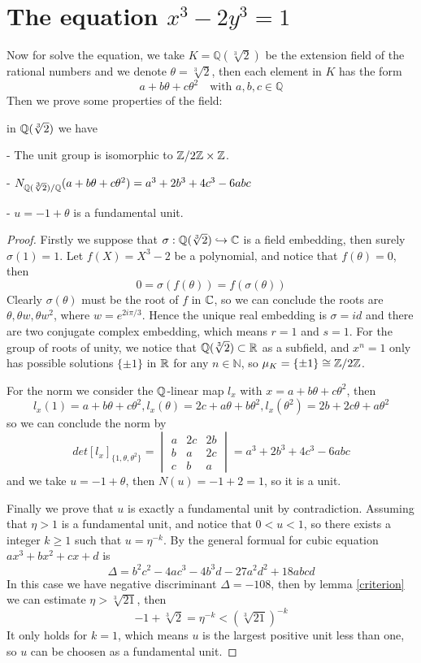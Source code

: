 \section{The equation $x^3-2y^3=1$}
Now for solve the equation, we take \(K = \mathbb{Q}(\sqrt[3]{2})\) be the extension field of the rational numbers and we denote \(\theta = \sqrt[3]{2}\), then each element in \(K\) has the form
\[a+b\theta +c \theta^2 \quad  \text{with } a,b,c  \in \mathbb{Q}\]
Then we prove some properties of the field:
\begin{proposition} \label{qqsqrt}
    in \(\mathbb{Q}(\sqrt[3]{2})\) we have

    - The unit group is isomorphic to \(\mathbb{Z}/2\mathbb{Z} \times \mathbb{Z}\).

    - \(N_{\mathbb{Q}(\sqrt[3]{2}) / \mathbb{Q}}(a+b\theta+c\theta^2) = a^3+2b^3+4c^3-6abc\)

    - \(u = -1 + \theta \) is a fundamental unit.


    \begin{proof}
        Firstly we suppose that \(\sigma: \mathbb{Q}(\sqrt[3]{2}) \hookrightarrow  \mathbb{C} \) is a field embedding, then surely \(\sigma(1)=1\). Let \(f(X) = X^3-2\) be a polynomial, and notice that \(f(\theta) = 0\), then
        \[0 = \sigma(f(\theta)) = f(\sigma(\theta))\]
        Clearly \(\sigma(\theta)\) must be the root of \(f\) in \(\mathbb{C}\), so we can conclude the roots are \(\theta, \theta w , \theta w^2\), where \(w = e^{2i\pi /3}\). Hence the unique real embedding is \(\sigma=id\) and there are two conjugate complex embedding, which means \(r=1\) and \(s=1\). For the group of roots of unity, we notice that \(\mathbb{Q}(\sqrt[3]{2}) \subset \mathbb{R}\) as a subfield, and \(x^n=1\) only has possible solutions \(\{\pm 1\}\) in \(\mathbb{R}\) for any \(n \in \mathbb{N}\), so \(\mu_K = \{\pm 1\} \cong \mathbb{Z}/2\mathbb{Z}\).

        For the norm we consider the \(\mathbb{Q}\)-linear map \(l_x\) with \(x=a+b \theta + c \theta^2\), then
        \[l_x(1) = a+b \theta + c \theta^2, l_x(\theta )= 2c+a \theta + b \theta ^2, l_x(\theta ^2) = 2b+ 2c \theta + a \theta ^2 \]
        so we can conclude the norm by 
        \[det{[l_x]_{\{1,\theta,\theta ^2\}}} = \begin{vmatrix}
            a & 2c & 2b \\
            b & a & 2c \\
            c & b & a
        \end{vmatrix} = a^3+2b^3+4c^3-6abc\]
        and we take \(u= -1 + \theta\), then \(N(u) = -1+2=1\), so it is a unit.

        Finally we prove that \(u\) is exactly a fundamental unit by contradiction. Assuming that \(\eta>1\) is a fundamental unit, and notice that \(0<u<1\), so there exists a integer \(k \geq 1\) such that \(u = \eta^{-k}\). By the general formual for cubic equation \(ax^3+bx^2+cx+d\) is 
        \[\Delta = b^2 c^2 -4ac^3-4b^3d-27a^2d^2+18abcd\]
        In this case we have negative discriminant \(\Delta = -108\), then by lemma \ref{criterion} we can estimate \(\eta > \sqrt[3]{21}\), then 
        \[-1 + \sqrt[3]{2} = \eta^{-k} < (\sqrt[3]{21})^{-k}\]
        It only holds for \(k=1\), which means \(u\) is the largest positive unit less than one, so \(u\) can be choosen as a fundamental unit.
        

\end{proof}
\end{proposition}
